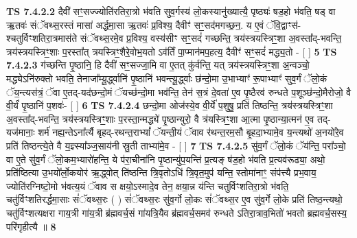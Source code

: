 \documentclass[17pt]{extarticle}
\begin{document}
                  \newline
                                \textbf{ TS 7.4.2.2} \newline
                  दैवी॑ सꣳ॒॒सज्ज्योति॑रतिरा॒त्रो भ॑वति सुव॒र्गस्य॑ लो॒कस्यानु॑ख्यात्यै॒ पृष्ठ्यः॑ षड॒हो भ॑वति॒ षड् वा ऋ॒तवः॑ संॅवथ्स॒रस्तं मासा॑ अर्द्धमा॒सा ऋ॒तवः॑ प्र॒विश्य॒ दैवीꣳ॑ सꣳ॒॒सद॑मगच्छ॒न॒. य ए॒वं ॅवि॒द्वाꣳस॑-श्चतुर्विꣳशतिरा॒त्रमास॑ते संॅवथ्स॒रमे॒व प्र॒विश्य॒ वस्य॑सीꣳ सꣳ॒॒सदं॑ गच्छन्ति॒ त्रय॑स्त्रयस्त्रिꣳ॒॒शा अ॒वस्ता᳚द्-भवन्ति॒ त्रय॑स्त्रयस्त्रिꣳ॒॒शाः प॒रस्ता᳚त् त्रयस्त्रिꣳ॒॒शैरे॒वोभ॒यतो ऽव॑र्तिं पा॒प्मान॑मप॒हत्य॒ दैवीꣳ॑ सꣳ॒॒सदं॑ मद्ध्य॒तो - [  ] \textbf{  5} \newline
                  \newline
                                \textbf{ TS 7.4.2.3} \newline
                  ग॑च्छन्ति पृ॒ष्ठानि॒ हि दैवी॑ सꣳ॒॒सज्जा॒मि वा ए॒तत् कु॑र्वन्ति॒ यत् त्रय॑स्त्रयस्त्रिꣳ॒॒शा अ॒न्वञ्चो॒ मद्ध्येऽनि॑रुक्तो भवति॒ तेनाजा᳚म्यू॒र्द्ध्वानि॑ पृ॒ष्ठानि॑ भवन्त्यू॒र्द्ध्वाः छ॑न्दो॒मा उ॒भाभ्याꣳ॑ रू॒पाभ्याꣳ॑ सुव॒र्गं ॅलो॒कं ॅय॒न्त्यस॑त्रं॒ ॅवा ए॒तद्-यद॑छन्दो॒मं ॅयच्छ॑न्दो॒मा भव॑न्ति॒ तेन॑ स॒त्रं दे॒वता॑ ए॒व पृ॒ष्ठैरव॑ रुन्धते प॒शूञ्छ॑न्दो॒मैरोजो॒ वै वी॒र्यं॑ पृ॒ष्ठानि॑ प॒शवः॑- [  ] \textbf{  6} \newline
                  \newline
                                \textbf{ TS 7.4.2.4} \newline
                  छन्दो॒मा ओज॑स्ये॒व वी॒र्ये॑ प॒शुषु॒ प्रति॑ तिष्ठन्ति॒ त्रय॑स्त्रयस्त्रिꣳ॒॒शा अ॒वस्ता᳚द्-भवन्ति॒ त्रय॑स्त्रयस्त्रिꣳ॒॒शाः प॒रस्ता॒न्मद्ध्ये॑ पृ॒ष्ठान्युरो॒ वै त्र॑यस्त्रिꣳ॒॒शा आ॒त्मा पृ॒ष्ठान्या॒त्मन॑ ए॒व तद्-यज॑मानाः॒ शर्म॑ नह्य॒न्तेऽना᳚र्त्यै बृहद्-रथन्त॒राभ्यां᳚ ॅयन्ती॒यं ॅवाव र॑थन्त॒रम॒सौ बृ॒हदा॒भ्यामे॒व य॒न्त्यथो॑ अ॒नयो॑रे॒व प्रति॑ तिष्ठन्त्ये॒ते वै य॒ज्ञ्स्या᳚ञ्ज॒साय॑नी स्रु॒ती ताभ्या॑मे॒व - [  ] \textbf{  7} \newline
                  \newline
                                \textbf{ TS 7.4.2.5} \newline
                  सु॑व॒र्गं ॅलो॒कं ॅय॑न्ति॒ परा᳚ञ्चो॒ वा ए॒ते सु॑व॒र्गं ॅलो॒कम॒भ्यारो॑हन्ति॒ ये प॑रा॒चीना॑नि पृ॒ष्ठान्यु॑प॒यन्ति॑ प्र॒त्यङ् ष॑ड॒हो भ॑वति प्र॒त्यव॑रूढ्या॒ अथो॒ प्रति॑ष्ठित्या उ॒भयो᳚र्लो॒कयोर॑ ऋ॒द्ध्वोत् ति॑ष्ठन्ति त्रि॒वृतोऽधि॑ त्रि॒वृत॒मुप॑ यन्ति॒ स्तोमा॑नाꣳ॒॒ संप॑त्त्यै प्रभ॒वाय॒ ज्योति॑रग्निष्टो॒मो भ॑वत्य॒यं ॅवाव स क्षयो॒ऽस्मादे॒व तेन॒ क्षया॒न्न य॑न्ति चतुर्विꣳशतिरा॒त्रो भ॑वति॒ चतु॑र्विꣳशतिरर्द्धमा॒साः सं॑ॅवथ्स॒रः ( ) सं॑ॅवथ्स॒रः सु॑व॒र्गो लो॒कः सं॑ॅवथ्स॒र ए॒व सु॑व॒र्गे लो॒के प्रति॑ तिष्ठ॒न्त्यथो॒ चतु॑र्विꣳशत्यक्षरा गाय॒त्री गा॑य॒त्री ब्र॑ह्मवर्च॒सं गा॑यत्रि॒यैव ब्र॑ह्मवर्च॒समव॑ रुन्धते ऽतिरा॒त्राव॒भितो॑ भवतो ब्रह्मवर्च॒सस्य॒ परि॑गृहीत्यै ॥ \textbf{  8} \newline
\end{document}
